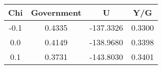 \begin{tabular}{c c c c}
\hline
Chi & Government & U & Y/G \\
\hline
-0.1 & 0.4335 & -137.3326 & 0.3300 \\
0.0 & 0.4149 & -138.9680 & 0.3398 \\
0.1 & 0.3731 & -143.8030 & 0.3401 \\
\hline
\end{tabular}
